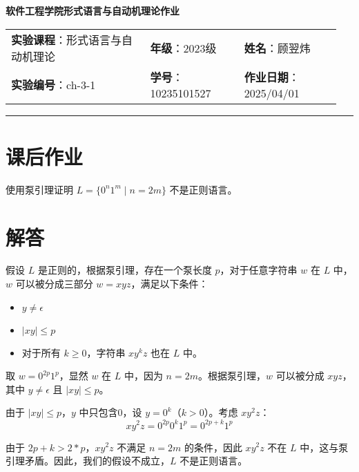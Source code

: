 \documentclass{article}
\begin{document}
	
	\begin{center}
		{\Large{\textbf{\heiti 软件工程学院形式语言与自动机理论作业}}}
		\begin{table}[htb]
			\flushleft
			\begin{tabular}{p{0.4\linewidth}p{0.27\linewidth}p{0.28\linewidth}}\\
				\textbf{实验课程}：形式语言与自动机理论  & \textbf{年级}：2023级       & \textbf{姓名}：顾翌炜  \\
				\textbf{实验编号}：ch-3-1    & \textbf{学号}：10235101527 & \textbf{作业日期}：2025/04/01  \\
			\end{tabular}
		\end{table}
	\end{center}
	\rule{\textwidth}{2pt}
	
	\section*{课后作业}
	
	使用泵引理证明 \( L = \{0^n1^m \mid n = 2m\} \) 不是正则语言。
	
	\section*{解答}
	
	假设 \( L \) 是正则的，根据泵引理，存在一个泵长度 \( p \)，对于任意字符串 \( w \) 在 \( L \) 中， \( w \) 可以被分成三部分 \( w = xyz \)，满足以下条件：
	\begin{itemize}
		\item \( y \neq \epsilon \)
		\item \( |xy| \leq p \)
		\item 对于所有 \( k \geq 0 \)，字符串 \( xy^kz \) 也在 \( L \) 中。
	\end{itemize}
	
	取 \( w = 0^{2p}1^p \)，显然 \( w \) 在 \( L \) 中，因为 \( n = 2m \)。根据泵引理，\( w \) 可以被分成 \( xyz \)，其中 \( y \neq \epsilon \) 且 \( |xy| \leq p \)。
	
	由于 \( |xy| \leq p \)，\( y \) 中只包含0，设 \( y = 0^k \)（\( k > 0 \)）。考虑 \( xy^2z \)：
	\[ xy^2z = 0^{2p}0^k1^p = 0^{2p+k}1^p \]
	
	由于 \( 2p+k > 2 * p \)，\( xy^2z \) 不满足 \( n = 2m \) 的条件，因此 \( xy^2z \) 不在 \( L \) 中，这与泵引理矛盾。因此，我们的假设不成立，\( L \) 不是正则语言。
	
\end{document}
